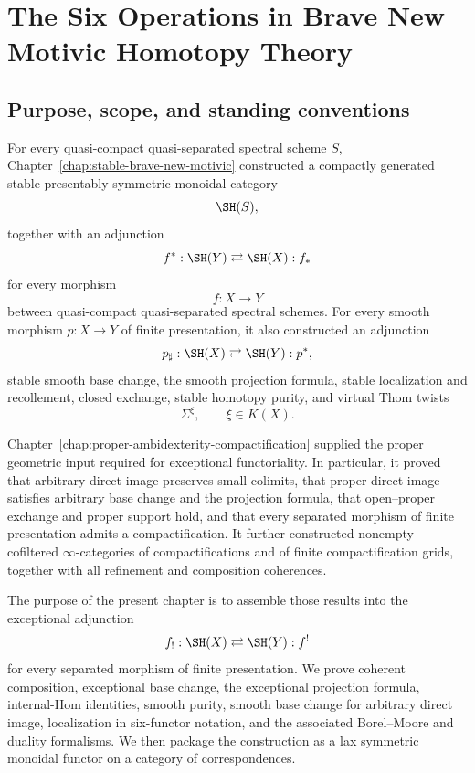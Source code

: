 \chapter{The Six Operations in Brave New Motivic Homotopy Theory}
\label{chap:six-operations}

\section{Purpose, scope, and standing conventions}
\label{sec:six-purpose}

For every quasi-compact quasi-separated spectral scheme \(S\),
Chapter~\ref{chap:stable-brave-new-motivic} constructed a compactly generated
stable presentably symmetric monoidal category
\[
    \SH(S),
\]
together with an adjunction
\[
    f^*:\SH(Y)
    \rightleftarrows
    \SH(X):f_*
\]
for every morphism
\[
    f:X\longrightarrow Y
\]
between quasi-compact quasi-separated spectral schemes.  For every smooth
morphism \(p:X\to Y\) of finite presentation, it also constructed an
adjunction
\[
    p_\sharp:\SH(X)
    \rightleftarrows
    \SH(Y):p^*,
\]
stable smooth base change, the smooth projection formula, stable
localization and recollement, closed exchange, stable homotopy purity, and
virtual Thom twists
\[
    \Sigma^\xi,
    \qquad
    \xi\in K(X).
\]

Chapter~\ref{chap:proper-ambidexterity-compactification} supplied the proper
geometric input required for exceptional functoriality.  In particular, it
proved that arbitrary direct image preserves small colimits, that proper
direct image satisfies arbitrary base change and the projection formula,
that open--proper exchange and proper support hold, and that every separated
morphism of finite presentation admits a compactification.  It further
constructed nonempty cofiltered \(\infty\)-categories of compactifications
and of finite compactification grids, together with all refinement and
composition coherences.

The purpose of the present chapter is to assemble those results into the
exceptional adjunction
\[
    f_!:\SH(X)
    \rightleftarrows
    \SH(Y):f^!
\]
for every separated morphism of finite presentation.  We prove coherent
composition, exceptional base change, the exceptional projection formula,
internal-Hom identities, smooth purity, smooth base change for arbitrary
direct image, localization in six-functor
notation, and the associated Borel--Moore and duality formalisms.  We then
package the construction as a lax symmetric monoidal functor on a category of
correspondences.

